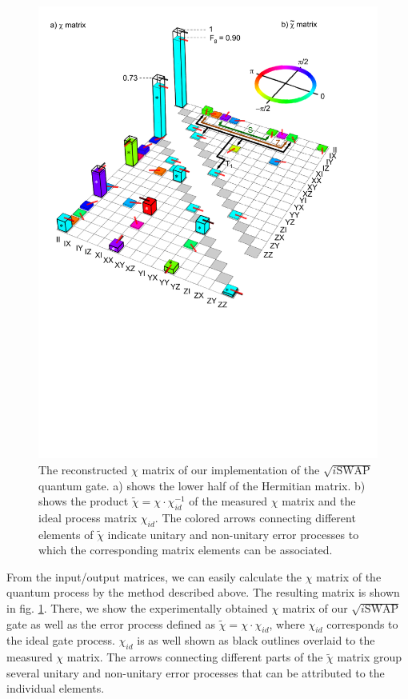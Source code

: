 \smallskip

\begin{figure}[ht!]
	\centering
		\includegraphics[width=1.\textwidth]{./material/papers/iswap/figures/chi_matrix_and_error_process}
	\caption{The reconstructed $\chi$ matrix of our implementation of the $\sqrt{i\mathrm{SWAP}}$ quantum gate. a) shows the lower half of the Hermitian matrix. b) shows the product $\tilde{\chi}=\chi\cdot\chi_{id}^{-1}$ of the measured $\chi$ matrix and the ideal process matrix $\chi_{id}$. The colored arrows connecting different elements of $\tilde{\chi}$ indicate unitary and non-unitary error processes to which the corresponding matrix elements can be associated.}
	\label{fig:chi_matrix_and_errors}
\end{figure}

From the input/output matrices, we can easily calculate the $\chi$ matrix of the quantum process by the method described above. The resulting matrix is shown in fig. \ref{fig:chi_matrix_and_errors}. There, we show the experimentally obtained $\chi$ matrix of our $\sqrt{i\mathrm{SWAP}}$ gate as well as the error process defined as $\tilde{\chi} = \chi\cdot\chi_{id}$, where $\chi_{id}$ corresponds to the ideal gate process. $\chi_{id}$ is as well shown as black outlines overlaid to the measured $\chi$ matrix. The arrows connecting different parts of the $\tilde{\chi}$ matrix group several unitary and non-unitary error processes that can be attributed to the individual elements.

